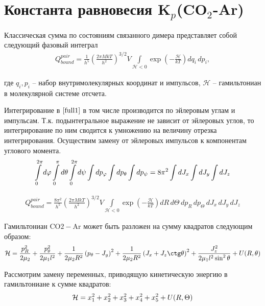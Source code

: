 \documentclass[12pt]{article}
\newcommand{\lb}{\left(}
\newcommand{\rb}{\right)}
\newcommand{\mH}{\mathcal{H}}
\newcommand{\intl}{\int\limits}
\begin{document}
\section*{Константа равновесия K$_p$(CO$_2$-Ar)}

Классическая сумма по состояниям связанного димера представляет собой следующий фазовый интеграл
\begin{gather}
	Q_{bound}^{pair} = \frac{1}{h^{5}} \lb \frac{2 \pi M k T}{h^2} \rb^{3/2} V \intl_{\mH < 0} \exp \lb - \frac{\mH}{k T} \rb d q_i \, d p_i, \label{full1} 
\end{gather}

где $q_i, p_i$ -- набор внутримолекулярных координат и импульсов, $\mH$ -- гамильтониан в молекулярной системе отсчета. \par

Интегрирование в $\eqref{full1}$ в том числе производится по эйлеровым углам и импульсам. Т.к. подынтегральное выражение не зависит от эйлеровых углов, то интегрирование по ним сводится к умножению на величину отрезка интегрирования. Осуществим замену от эйлеровых импульсов к компонентам углового момента. 
\begin{gather}
	\intl_{0}^{2 \pi} d \varphi \intl_{0}^{\pi} d \theta \intl_{0}^{2 \pi} d \psi \int d p_\varphi \int d p_\theta \int d p_\psi = 8 \pi^2 \int d J_x \int d J_y \int d J_z \notag
\end{gather}

\begin{gather}
		Q_{bound}^{pair} = \frac{8 \pi^2}{h^5} \lb \frac{2 \pi M k T}{h^2} \rb^{3/2} V \intl_{\mH < 0} \exp \lb - \frac{\mH}{k T} \rb d R \, d \Theta \, d p_R \, d p_\Theta \, d J_x \, d J_y \, d J_z \label{full2}
\end{gather}

Гамильтониан CO$2-$Ar может быть разложен на сумму квадратов следующим образом: 
\begin{gather}
	\mH = \frac{p_R^2}{2 \mu_2} + \frac{p_\theta^2}{2 \mu_1 l^2} + \frac{1}{2 \mu_2 R^2} \lb p_\theta - J_y \rb^2 + \frac{1}{2 \mu_2 R^2} \lb J_x + J_z \ctg \theta \rb^2 + \frac{J_z^2}{2 \mu_1 l^2 \sin^2 \theta} + U(R, \theta) \notag
\end{gather}

Рассмотрим замену переменных, приводящую кинетическую энергию в гамильтониане к сумме квадратов:
\begin{gather}
		\mH = x_1^2 + x_2^2 + x_3^2 + x_4^2 + x_5^2 + U(R, \Theta) \notag
\end{gather}
\end{document}
